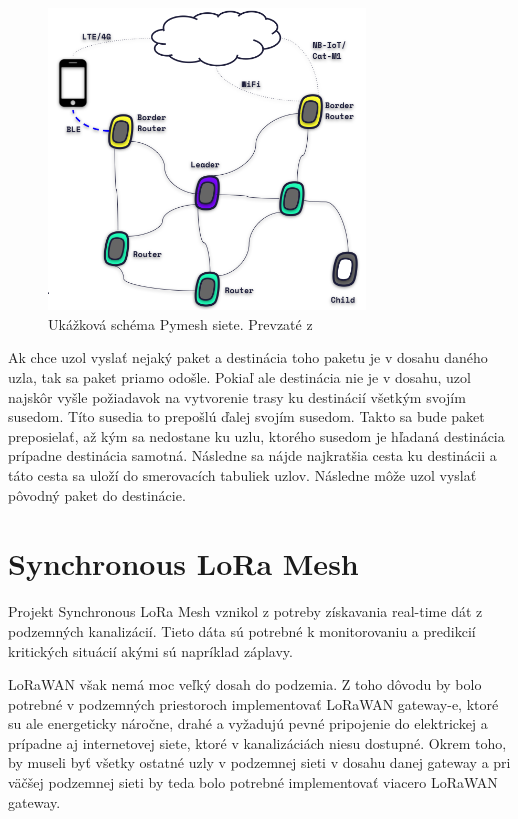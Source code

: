 \documentclass[slovak,master]{diploma}
\begin{document}
\begin{figure}[h!]
	\centering
	\includegraphics[width=0.75\textwidth]{Figures/pymesh_roles.png}
	\caption{Ukážková schéma Pymesh siete. Prevzaté z \cite{pycom}}
	\label{fig:pymeshTop}
\end{figure}


Ak chce uzol vyslať nejaký paket a destinácia toho paketu je v dosahu daného uzla, tak sa paket priamo odošle. 
Pokiaľ ale destinácia nie je v dosahu, uzol najskôr vyšle požiadavok na vytvorenie trasy ku destinácií všetkým svojím susedom. Títo susedia to prepošlú ďalej svojím susedom. 
Takto sa bude paket preposielať, až kým sa nedostane ku uzlu, ktorého susedom je hľadaná destinácia prípadne destinácia samotná. Následne sa nájde najkratšia cesta ku destinácii a táto cesta sa uloží do smerovacích 
tabuliek uzlov. Následne môže uzol vyslať pôvodný paket do destinácie.


\section{Synchronous LoRa Mesh}
Projekt Synchronous LoRa Mesh \cite{synchronouslorameshnetwork} vznikol z potreby získavania real-time dát z podzemných kanalizácií. Tieto dáta sú potrebné k monitorovaniu a predikcií kritických situácií akými 
sú napríklad záplavy.

LoRaWAN však nemá moc veľký dosah do podzemia. Z toho dôvodu by bolo potrebné v podzemných priestoroch implementovať LoRaWAN gateway-e, ktoré su ale energeticky náročne, drahé a vyžadujú 
pevné pripojenie do elektrickej a prípadne aj internetovej siete, ktoré v kanalizáciách niesu dostupné. Okrem toho, by museli byť všetky ostatné uzly v podzemnej sieti v dosahu danej gateway a pri väčšej podzemnej sieti 
by teda bolo potrebné implementovať viacero LoRaWAN gateway.
\end{document}

